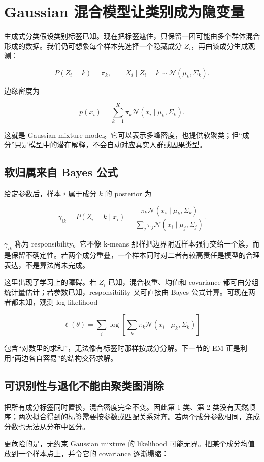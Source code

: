 \section{Gaussian 混合模型让类别成为隐变量}

生成式分类假设类别标签已知。现在把标签遮住，只保留一团可能由多个群体混合形成的数据。我们仍可想象每个样本先选择一个隐藏成分 \(Z_i\)，再由该成分生成观测：

\[
P(Z_i=k)=\pi_k,\qquad
X_i\mid Z_i=k\sim\mathcal N(\mu_k,\Sigma_k).
\]

边缘密度为

\[
p(x_i)=\sum_{k=1}^K
\pi_k\mathcal N(x_i\mid\mu_k,\Sigma_k).
\]

这就是 Gaussian mixture model。它可以表示多峰密度，也提供软聚类；但``成分''只是模型中的潜在解释，不会自动对应真实人群或因果类型。

\subsection{软归属来自 Bayes 公式}

给定参数后，样本 \(i\) 属于成分 \(k\) 的 posterior 为

\[
\gamma_{ik}
=P(Z_i=k\mid x_i)
=\frac{
\pi_k\mathcal N(x_i\mid\mu_k,\Sigma_k)
}{
\sum_j\pi_j\mathcal N(x_i\mid\mu_j,\Sigma_j)
}.
\]

\(\gamma_{ik}\) 称为 responsibility。它不像 k-means 那样把边界附近样本强行交给一个簇，而是保留不确定性。若两个成分重叠，一个样本同时对二者有较高责任是模型的合理表达，不是算法尚未完成。

这里出现了学习上的障碍。若 \(Z_i\) 已知，混合权重、均值和 covariance 都可由分组统计量估计；若参数已知，responsibility 又可直接由 Bayes 公式计算。可现在两者都未知，观测 log-likelihood

\[
\ell(\theta)
=\sum_i\log
\left[
\sum_k\pi_k
\mathcal N(x_i\mid\mu_k,\Sigma_k)
\right]
\]

包含``对数里的求和''，无法像有标签时那样按成分分解。下一节的 EM 正是利用``两边各自容易''的结构交替求解。

\subsection{可识别性与退化不能由聚类图消除}

把所有成分标签同时置换，混合密度完全不变。因此第 1 类、第 2 类没有天然顺序；两次拟合得到的标签需要按参数或匹配关系对齐。若两个成分参数相同，连成分数也无法从分布中区分。

更危险的是，无约束 Gaussian mixture 的 likelihood 可能无界。把某个成分均值放到一个样本点上，并令它的 covariance 逐渐塌缩：

